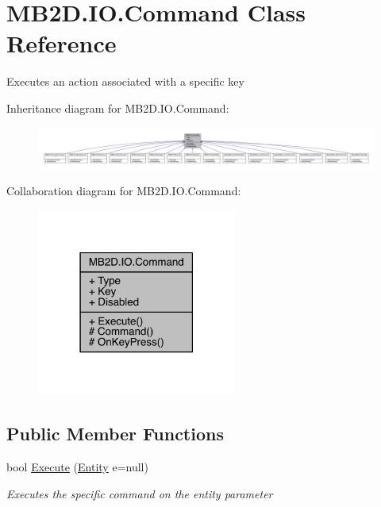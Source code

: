 \hypertarget{class_m_b2_d_1_1_i_o_1_1_command}{}\section{M\+B2\+D.\+I\+O.\+Command Class Reference}
\label{class_m_b2_d_1_1_i_o_1_1_command}


Executes an action associated with a specific key  




Inheritance diagram for M\+B2\+D.\+I\+O.\+Command\+:\nopagebreak
\begin{figure}[H]
\begin{center}
\leavevmode
\includegraphics[width=350pt]{class_m_b2_d_1_1_i_o_1_1_command__inherit__graph}
\end{center}
\end{figure}


Collaboration diagram for M\+B2\+D.\+I\+O.\+Command\+:\nopagebreak
\begin{figure}[H]
\begin{center}
\leavevmode
\includegraphics[width=186pt]{class_m_b2_d_1_1_i_o_1_1_command__coll__graph}
\end{center}
\end{figure}
\subsection*{Public Member Functions}
\begin{DoxyCompactItemize}
\item 
bool \hyperlink{class_m_b2_d_1_1_i_o_1_1_command_a59f97dd5810dd5b112c82ad3758da7e8}{Execute} (\hyperlink{class_m_b2_d_1_1_entity_component_1_1_entity}{Entity} e=null)
\begin{DoxyCompactList}\small\item\em Executes the specific command on the entity parameter \end{DoxyCompactList}\end{DoxyCompactItemize}
